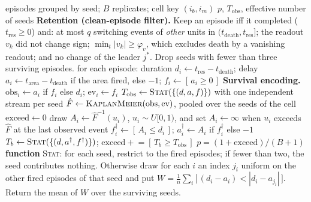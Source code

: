 \documentclass[11pt]{article}
\theoremstyle{definition}
\theoremstyle{remark}
\begin{document}
\begin{algorithm}[h]
\caption{Truncated calibrated null for the area-delay statistic}
\label{alg:nulo}
\begin{algorithmic}[1]
\REQUIRE episodes grouped by seed; $B$ replicates; cell key $(i_b,i_m)$
\ENSURE $p$, $T_{\mathrm{obs}}$, effective number of seeds
\STATE \textbf{Retention (clean-episode filter).} Keep an episode iff it
completed ($t_{\mathrm{res}}\ge0$) and: at most $q$ switching events of
\emph{other} units in $(t_{\mathrm{death}},t_{\mathrm{res}}]$; the readout $v_k$
did not change sign; $\min_t|v_k|\ge\varphi_v$, which excludes death by a
vanishing readout; and no change of the leader $j^\ast$. Drop seeds with fewer
than three surviving episodes.
\STATE for each episode: duration $d_i\leftarrow t_{\mathrm{res}}-t_{\mathrm{death}}$;
       delay $a_i\leftarrow t_{\mathrm{area}}-t_{\mathrm{death}}$ if the area
       fired, else $-1$; \; $f_i\leftarrow[\,a_i\ge0\,]$
\STATE \textbf{Survival encoding.} $\mathrm{obs}_i\leftarrow a_i$ if $f_i$ else
       $d_i$; \; $\mathrm{ev}_i\leftarrow f_i$
\STATE $T_{\mathrm{obs}}\leftarrow\textsc{Stat}(\{(d,a,f)\})$ with one
       independent stream per seed
\STATE $\hat F\leftarrow\textsc{KaplanMeier}(\mathrm{obs},\mathrm{ev})$, pooled
       over the seeds of the cell
\STATE $\mathrm{exceed}\leftarrow0$
    \STATE draw $A_i\leftarrow\hat F^{-1}(u_i)$, $u_i\sim U[0,1)$, and set
           $A_i\leftarrow\infty$ when $u_i$ exceeds $\hat F$ at the last observed
           event 
    \STATE $f^\dagger_i\leftarrow[\,A_i\le d_i\,]$; \;
           $a^\dagger_i\leftarrow A_i$ if $f^\dagger_i$ else $-1$
  \ENDFOR
  \STATE $T_b\leftarrow\textsc{Stat}(\{(d,a^\dagger,f^\dagger)\})$; \;
         $\mathrm{exceed}\mathrel{+}=[\,T_b\ge T_{\mathrm{obs}}\,]$
\ENDFOR
\RETURN $p=(1+\mathrm{exceed})/(B+1)$
\medskip
\STATE \textbf{function} \textsc{Stat}: for each seed, restrict to the fired
episodes; if fewer than two, the seed contributes nothing. Otherwise draw for
each $i$ an index $j_i$ uniform on the other fired episodes of that seed and put
$W=\frac1n\sum_i\bigl[\,(d_i-a_i)<|d_i-a_{j_i}|\,\bigr]$. Return the mean of $W$
over the surviving seeds.
\end{algorithmic}
\end{algorithm}
\end{document}
